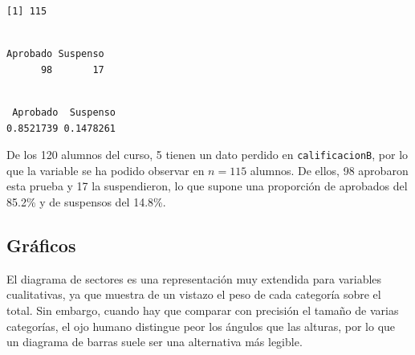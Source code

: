 \documentclass[
  spanish,
  a4paper,
]{scrreport}
\newenvironment{Shaded}{\begin{snugshade}}{\end{snugshade}}
\newcommand{\FunctionTok}[1]{\textcolor[rgb]{0.28,0.35,0.67}{#1}}
\newcommand{\NormalTok}[1]{\textcolor[rgb]{0.00,0.23,0.31}{#1}}
\newcommand{\SpecialCharTok}[1]{\textcolor[rgb]{0.37,0.37,0.37}{#1}}
\theoremstyle{definition}
\theoremstyle{definition}
\theoremstyle{remark}
\begin{document}
\begin{verbatim}
[1] 115
\end{verbatim}

\begin{Shaded}
\end{Shaded}

\begin{verbatim}

Aprobado Suspenso 
      98       17 
\end{verbatim}

\begin{Shaded}
\end{Shaded}

\begin{verbatim}

 Aprobado  Suspenso 
0.8521739 0.1478261 
\end{verbatim}

De los 120 alumnos del curso, 5 tienen un dato perdido en
\texttt{calificacionB}, por lo que la variable se ha podido observar en
\(n=115\) alumnos. De ellos, 98 aprobaron esta prueba y 17 la
suspendieron, lo que supone una proporción de aprobados del 85.2\% y de
suspensos del 14.8\%.

\subsection{Gráficos}\label{gruxe1ficos-1}

El diagrama de sectores es una representación muy extendida para
variables cualitativas, ya que muestra de un vistazo el peso de cada
categoría sobre el total. Sin embargo, cuando hay que comparar con
precisión el tamaño de varias categorías, el ojo humano distingue peor
los ángulos que las alturas, por lo que un diagrama de barras suele ser
una alternativa más legible.
\end{document}
